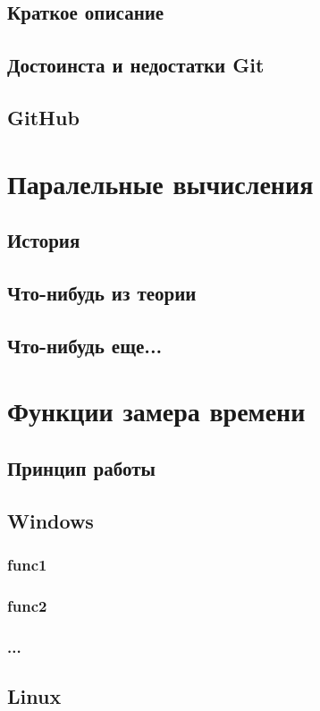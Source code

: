\documentclass{article}
\begin{document}
		\subsection{Краткое описание}
		\subsection{Достоинста и недостатки Git}
		\subsection{GitHub}
	\newpage
	\section{Паралельные вычисления}
		\subsection{История}
		\subsection{Что-нибудь из теории}
		\subsection{Что-нибудь еще...}
	\newpage
	\section{Функции замера времени}
		\subsection{Принцип работы}
		\subsection{Windows}
			\subsubsection{func1}
			\subsubsection{func2}
			\subsubsection{...}
		\subsection{Linux}
\end{document}
